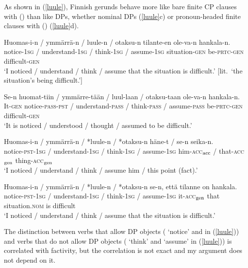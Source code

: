\documentclass[output=paper,
modfonts
]{LSP/langsci}
\newcommand{\rf}[1]{(\ref{#1})}
\newcommand{\rfa}[2]{(\ref{#1}{#2})}
\def\trf#1{$_{\textrm{\scriptsize{#1}}}$}
\begin{document}
As shown in \rf{luule}, Finnish gerunds behave more like bare finite CP clauses with 
() than like DPs, whether nominal DPs \rfa{luule}{c} or
pronoun-headed finite clauses with  () \rfa{luule}{d}.
\begin{exe}
\ex\label{luule}
	\ea	\gll Huomas-i-n / ymmärrä-n / luule-n / otaksu-n tilante-en ole-va-n hankala-n. \\
		  notice-\textsc{1sg} / understand-\textsc{1sg} / think-\textsc{1sg} / assume-\textsc{1sg}
		  situation-\textsc{gen} be-\textsc{prtc}-\textsc{gen} difficult-\textsc{gen}\\ 
 		\glt `I noticed / understand / think / assume that the situation is difficult.' [lit.\ `the
		  situation's being difficult.'] 

	\ex \gll Se-n huomat-tiin / ymmärre-tään / luul-laan / otaksu-taan ole-va-n hankala-n.\\
		  It-\textsc{gen} notice-\textsc{pass}-\textsc{pst} / understand-\textsc{pass} / think-\textsc{pass} /
		  assume-\textsc{pass} be-\textsc{prtc}-\textsc{gen} difficult-\textsc{gen}\\ 
		\glt  `It is noticed / understood / thought / assumed to be difficult.'

	\ex \gll Huomas-i-n / ymmärrä-n / *luule-n / *otaksu-n häne-t / se-n seika-n. \\
		notice-\textsc{pst}-\textsc{1sg} / understand-\textsc{1sg} / think-\textsc{1sg} / assume-\textsc{1sg}
		him-\textsc{acc\trf{acc}} / that-\textsc{acc\trf{gen}} thing-\textsc{acc\trf{gen}}\\ 
		\glt `I noticed / understand / think / assume him / this point (fact).'

	\ex \gll Huomas-i-n / ymmärrä-n / *luule-n / *otaksu-n se-n, että tilanne on hankala. \\
		notice-\textsc{pst}-\textsc{1sg}  / understand-\textsc{1sg} / think-\textsc{1sg} / assume-\textsc{1sg}
		it-\textsc{acc\trf{gen}} that situation.\textsc{nom} is difficult\\ 
		\glt `I noticed / understand / think / assume that the situation is difficult.'
	\z    
\end{exe}
The distinction between verbs that allow DP objects ( `notice' and
 in \rf{luule}) and verbs that do not allow DP objects (
`think' and  `assume' in \rf{luule}) is correlated with factivity, but the
correlation is not exact and my argument does not depend on it.
\end{document}
